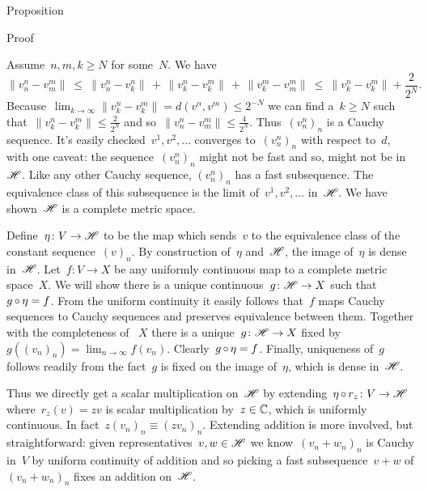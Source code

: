\documentclass[b]{subfiles}
\begin{document}
\begin{parsec}
\begin{point}{Proposition}
\begin{point}{Proof}
\begin{point}
Assume~$n,m,k \geq N$ for some~$N$.  We have
\begin{equation*}
    \| v^n_n - v^m_m \|
       \  \leq \ 
    \| v^n_n - v^n_k \| \,+\,
    \| v^n_k - v^m_k \| \,+\,
    \| v^m_k - v^m_m \|\  \leq \ 
    \| v^n_k - v^m_k \|+ \frac{2}{2^N}.
\end{equation*}
Because~$\lim_{k\to\infty} \|v_k^n-v_k^m \| =d(v^n,v^m) \leq 2^{-N}$
    we can find a~$k \geq N$
    such that~$\| v^n_k - v^m_k \| \leq \frac{2}{2^N}$
    and so~$\|v^n_n - v^m_m\| \leq \frac{4}{2^N}$.
    Thus~$(v^n_n)_n$ is a Cauchy sequence.
It's easily checked~$v^1, v^2, \ldots$
converges to~$(v^n_n)_n$ with respect to~$d$,
with one caveat: the sequence~$(v^n_n)_n$ might not be fast
    and so, might not be in~$\mathscr{H}$.
Like any other Cauchy sequence, $(v^n_n)_n$
    has a fast subsequence.
The equivalence class
    of this subsequence is the limit of~$v^1, v^2, \ldots$ in~$\mathscr{H}$.
We have shown~$\mathscr{H}$ is a complete metric space.
\end{point}
\begin{point}[prop-hilbert-space-completion-extension]%
Define~$\eta\colon V \to \mathscr{H}$
    to be the map which sends~$v$ to the equivalence class of the
    constant sequence~$(v)_n$.
By construction of~$\eta$ and~$\mathscr{H}$,
    the image of~$\eta$ is dense in~$\mathscr{H}$.
Let~$f\colon V \to X$
    be any uniformly continuous map to a complete metric space~$X$.
We will show there is a unique continuous~$g\colon \mathscr{H} \to X$
    such that~$g \mathop{\circ} \eta = f$.
From the uniform continuity it easily follows
    that~$f$ maps Cauchy sequences to Cauchy sequences
    and preserves equivalence between them.
Together with the completeness of ~$X$
    there is a unique~$g\colon \mathscr{H} \to X$
    fixed by~$g((v_n)_n) = \lim_{n\to\infty}f(v_n)$.
Clearly~$g \mathop{\circ} \eta = f$.
Finally, uniqueness of~$g$ follows readily from
    the fact~$g$ is fixed on the image of~$\eta$,
    which is dense in~$\mathscr{H}$.
\end{point}
\begin{point}%
Thus we directly get a scalar multiplication
    on~$\mathscr{H}$ by extending~$\eta \mathop{\circ} r_z \colon V \to \mathscr{H}$
    where~$r_z(v) = zv$ is scalar multiplication by~$z \in \mathbb{C}$,
    which is uniformly continuous.
In fact~$z (v_n)_n \equiv (z v_n)_n$.
Extending addition is more involved, but straightforward:
    given representatives~$v,w \in \mathscr{H}$
    we know~$(v_n+w_n)_n$ is Cauchy in~$V$
    by uniform continuity of addition and so
    picking a fast subsequence~$v+w$ of $(v_n+w_n)_n$
        fixes an addition on~$\mathscr{H}$.

\end{point}
\end{point}
\end{point}
\end{parsec}
\end{document}
